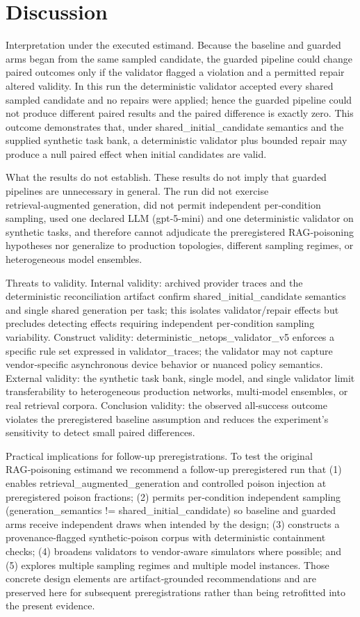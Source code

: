 \documentclass[conference]{IEEEtran}
\begin{document}
\section{Discussion}
Interpretation under the executed estimand. Because the baseline and guarded arms began from the same sampled candidate, the guarded pipeline could change paired outcomes only if the validator flagged a violation and a permitted repair altered validity. In this run the deterministic validator accepted every shared sampled candidate and no repairs were applied; hence the guarded pipeline could not produce different paired results and the paired difference is exactly zero. This outcome demonstrates that, under shared\_initial\_candidate semantics and the supplied synthetic task bank, a deterministic validator plus bounded repair may produce a null paired effect when initial candidates are valid.

What the results do not establish. These results do not imply that guarded pipelines are unnecessary in general. The run did not exercise retrieval‑augmented generation, did not permit independent per‑condition sampling, used one declared LLM (gpt-5-mini) and one deterministic validator on synthetic tasks, and therefore cannot adjudicate the preregistered RAG‑poisoning hypotheses nor generalize to production topologies, different sampling regimes, or heterogeneous model ensembles.

Threats to validity. Internal validity: archived provider traces and the deterministic reconciliation artifact confirm shared\_initial\_candidate semantics and single shared generation per task; this isolates validator/repair effects but precludes detecting effects requiring independent per‑condition sampling variability. Construct validity: deterministic\_netops\_validator\_v5 enforces a specific rule set expressed in validator\_traces; the validator may not capture vendor‑specific asynchronous device behavior or nuanced policy semantics. External validity: the synthetic task bank, single model, and single validator limit transferability to heterogeneous production networks, multi‑model ensembles, or real retrieval corpora. Conclusion validity: the observed all‑success outcome violates the preregistered baseline assumption and reduces the experiment's sensitivity to detect small paired differences.

Practical implications for follow-up preregistrations. To test the original RAG‑poisoning estimand we recommend a follow-up preregistered run that (1) enables retrieval\_augmented\_generation and controlled poison injection at preregistered poison fractions; (2) permits per‑condition independent sampling (generation\_semantics != shared\_initial\_candidate) so baseline and guarded arms receive independent draws when intended by the design; (3) constructs a provenance‑flagged synthetic‑poison corpus with deterministic containment checks; (4) broadens validators to vendor‑aware simulators where possible; and (5) explores multiple sampling regimes and multiple model instances. Those concrete design elements are artifact‑grounded recommendations and are preserved here for subsequent preregistrations rather than being retrofitted into the present evidence.
\end{document}
